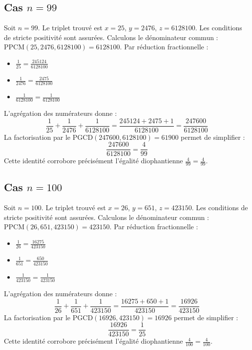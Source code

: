 \documentclass[11pt,a4paper]{article}
\begin{document}
\subsection{Cas $n = 99$}
Soit $n = 99$. Le triplet trouvé est $x = 25$, $y = 2476$, $z = 6128100$.
Les conditions de stricte positivité sont assurées.
Calculons le dénominateur commun : $\text{PPCM}(25, 2476, 6128100) = 6128100$.
Par réduction fractionnelle :
\begin{itemize}
    \item $\frac{1}{25} = \frac{245124}{6128100}$
    \item $\frac{1}{2476} = \frac{2475}{6128100}$
    \item $\frac{1}{6128100} = \frac{1}{6128100}$
\end{itemize}
L'agrégation des numérateurs donne :
$$ \frac{1}{25} + \frac{1}{2476} + \frac{1}{6128100} = \frac{245124 + 2475 + 1}{6128100} = \frac{247600}{6128100} $$
La factorisation par le $\text{PGCD}(247600, 6128100) = 61900$ permet de simplifier :
$$ \frac{247600}{6128100} = \frac{4}{99} $$
Cette identité corrobore précisément l'égalité diophantienne $\frac{4}{99} = \frac{4}{99}$.

\subsection{Cas $n = 100$}
Soit $n = 100$. Le triplet trouvé est $x = 26$, $y = 651$, $z = 423150$.
Les conditions de stricte positivité sont assurées.
Calculons le dénominateur commun : $\text{PPCM}(26, 651, 423150) = 423150$.
Par réduction fractionnelle :
\begin{itemize}
    \item $\frac{1}{26} = \frac{16275}{423150}$
    \item $\frac{1}{651} = \frac{650}{423150}$
    \item $\frac{1}{423150} = \frac{1}{423150}$
\end{itemize}
L'agrégation des numérateurs donne :
$$ \frac{1}{26} + \frac{1}{651} + \frac{1}{423150} = \frac{16275 + 650 + 1}{423150} = \frac{16926}{423150} $$
La factorisation par le $\text{PGCD}(16926, 423150) = 16926$ permet de simplifier :
$$ \frac{16926}{423150} = \frac{1}{25} $$
Cette identité corrobore précisément l'égalité diophantienne $\frac{4}{100} = \frac{4}{100}$.
\end{document}

